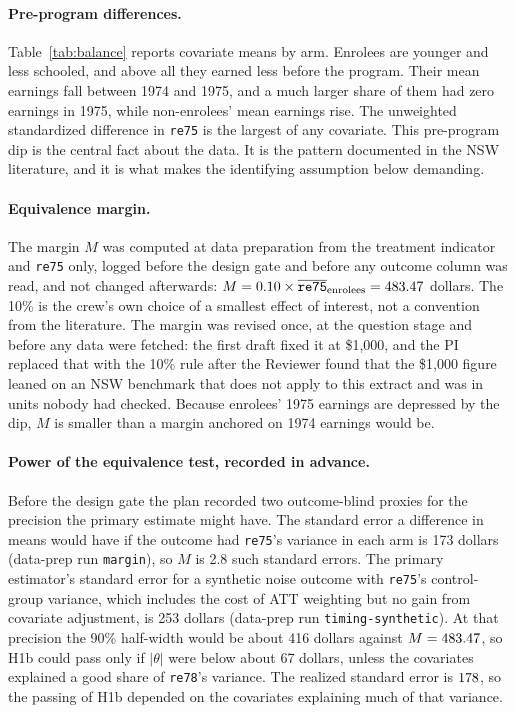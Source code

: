 \documentclass[11pt]{article}
\newcommand{\var}[1]{\texttt{#1}}
\begin{document}
\paragraph{Pre-program differences.} Table~\ref{tab:balance} reports covariate means by
arm. Enrolees are younger and less schooled, and above all they earned less before the
program. Their mean earnings fall between 1974 and 1975, and a much larger share of them had
zero earnings in 1975, while non-enrolees' mean earnings rise. The unweighted standardized
difference in \var{re75} is the largest of any covariate. This pre-program dip is the
central fact about the data. It is the pattern documented in the NSW literature, and it is
what makes the identifying assumption below demanding.

\paragraph{Equivalence margin.} The margin $M$ was computed at data preparation from the
treatment indicator and \var{re75} only, logged before the design gate and before any outcome
column was read, and not changed afterwards:
$M = 0.10 \times \overline{\var{re75}}_{\text{enrolees}} = \EquivMargin$ dollars. The
10\% is the crew's own choice of a smallest effect of interest, not a convention from the
literature. The margin was revised once, at the question stage and before any data were
fetched: the first draft fixed it at \$1,000, and the PI replaced that with the 10\% rule
after the Reviewer found that the \$1,000 figure leaned on an NSW benchmark that does not
apply to this extract and was in units nobody had checked. Because enrolees' 1975 earnings
are depressed by the dip, $M$ is smaller than a margin anchored on 1974 earnings would be.

\paragraph{Power of the equivalence test, recorded in advance.} Before the design gate the
plan recorded two outcome-blind proxies for the precision the primary estimate might have.
The standard error a difference in means would have if the outcome had \var{re75}'s variance
in each arm is 173 dollars (data-prep run \texttt{margin}), so $M$ is 2.8 such standard
errors. The primary estimator's standard error for a synthetic noise outcome with
\var{re75}'s control-group variance, which includes the cost of ATT weighting but no gain from
covariate adjustment, is 253 dollars (data-prep run \texttt{timing-synthetic}). At that
precision the 90\% half-width would be about 416 dollars against $M = 483.47$, so H1b
could pass only if $|\theta|$ were below about 67 dollars, unless the covariates explained a
good share of \var{re78}'s variance. The realized standard error is $178$, so the
passing of H1b depended on the covariates explaining much of that variance.
\end{document}
